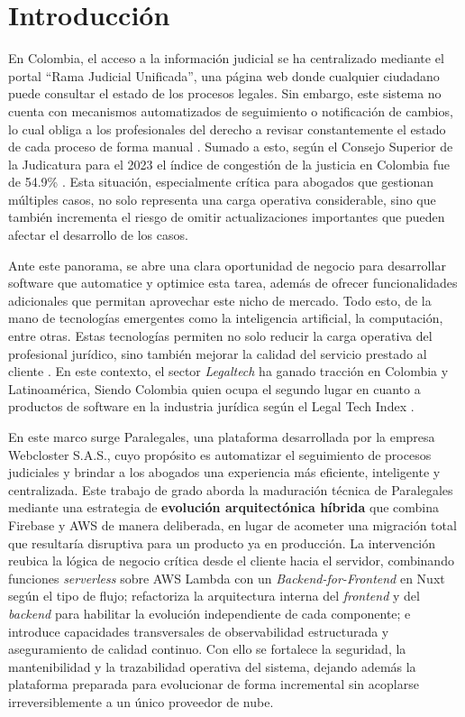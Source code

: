 \section{Introducción}

En Colombia, el acceso a la información judicial se ha centralizado mediante el portal  “Rama Judicial Unificada”, una página web donde cualquier ciudadano puede consultar el estado de los procesos legales. Sin embargo, este sistema no cuenta con mecanismos automatizados de seguimiento o notificación de cambios, lo cual obliga a los profesionales del derecho a revisar constantemente el estado de cada proceso de forma manual \cite{Paez2024}. Sumado a esto,  según el Consejo Superior de la Judicatura para el 2023 el índice de congestión de la justicia en Colombia fue de 54.9\% \cite{Rozo2024}. Esta situación, especialmente crítica para abogados que gestionan múltiples casos, no solo representa una carga operativa considerable, sino que también incrementa el riesgo de omitir actualizaciones importantes que pueden afectar el desarrollo de los casos.

Ante este panorama, se abre una clara oportunidad de negocio para desarrollar software que automatice y optimice esta tarea, además de ofrecer funcionalidades adicionales que permitan aprovechar este nicho de mercado. Todo esto, de la mano de tecnologías emergentes como la inteligencia artificial, la computación, entre otras. Estas tecnologías permiten no solo reducir la carga operativa del profesional jurídico, sino también mejorar la calidad del servicio prestado al cliente \cite{Botero2023}. En este contexto, el sector \textit{Legaltech} ha ganado tracción en Colombia y Latinoamérica, Siendo Colombia quien ocupa el segundo lugar en cuanto a productos de software en la industria jurídica según el Legal Tech Index \cite{Sierra2023}.

En este marco surge Paralegales, una plataforma desarrollada por la empresa Webcloster S.A.S., cuyo propósito es automatizar el seguimiento de procesos judiciales y brindar a los abogados una experiencia más eficiente, inteligente y centralizada. Este trabajo de grado aborda la maduración técnica de Paralegales mediante una estrategia de \textbf{evolución arquitectónica híbrida} que combina Firebase y AWS de manera deliberada, en lugar de acometer una migración total que resultaría disruptiva para un producto ya en producción. La intervención reubica la lógica de negocio crítica desde el cliente hacia el servidor, combinando funciones \textit{serverless} sobre AWS Lambda con un \textit{Backend-for-Frontend} en Nuxt según el tipo de flujo; refactoriza la arquitectura interna del \textit{frontend} y del \textit{backend} para habilitar la evolución independiente de cada componente; e introduce capacidades transversales de observabilidad estructurada y aseguramiento de calidad continuo. Con ello se fortalece la seguridad, la mantenibilidad y la trazabilidad operativa del sistema, dejando además la plataforma preparada para evolucionar de forma incremental sin acoplarse irreversiblemente a un único proveedor de nube.

